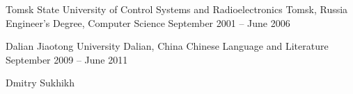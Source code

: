 \documentclass[11pt]{resume}
\begin{document}

\begin{cventries}

\cventry
  {Tomsk State University of Control Systems and Radioelectronics}
  {Tomsk, Russia}
  {Engineer’s Degree, Computer Science}
  {September 2001 – June 2006}
  { }

\cventry
  {Dalian Jiaotong University}
  {Dalian, China}
  {Chinese Language and Literature}
  {September 2009 – June 2011}
  { }

\end{cventries}

\makecvfooter
{Dmitry Sukhikh}
{\thepage}
{\pageref{LastPage}}
\end{document}
